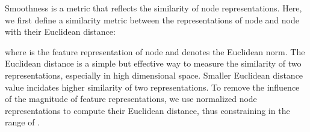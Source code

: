 \documentclass[sigconf]{acmart}
\begin{document}
Smoothness is a metric that reflects the similarity of node
representations. Here, we first define a similarity metric
between the representations of node  and node  with their
Euclidean distance:

where  is the feature representation of node
 and  denotes                                                                                                                                                                                                                                                                                                                                                                                                                                                                                                                                                                                                                                                                                                                                                                                                                                                                                                                                                                                                                                                                                                                                                                                                                                                                                                                                                                                                                                                                                                                                                                                                                                                                                                                                                                                                                                                                                                                                                                                                                                                                                                                                                                                                                                                                                                                                                                                                                                                              the Euclidean norm. The
Euclidean distance is a simple but effective way to measure the
similarity of two representations, especially in high dimensional
space. Smaller Euclidean distance value incidates higher
similarity of two representations. To remove the influence of the
magnitude of feature representations, we use normalized node
representations to compute their Euclidean distance, thus
constraining  in the range
of .
\end{document}
